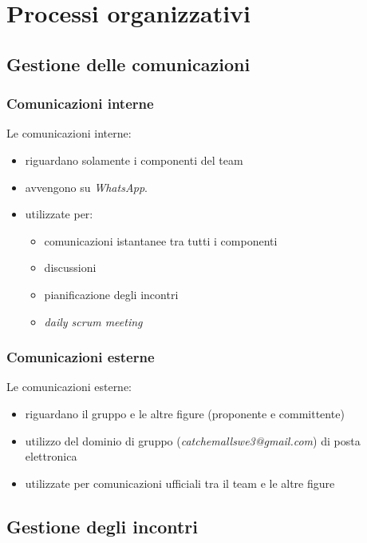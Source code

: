 \section{Processi organizzativi}
    \subsection{Gestione delle comunicazioni}
        \subsubsection{Comunicazioni interne}
        Le comunicazioni interne:
        \begin{itemize}
            \item riguardano solamente i componenti del team 
            \item avvengono su \textit{WhatsApp}.
            \item utilizzate per:
                \begin{itemize}
                    \item comunicazioni istantanee tra tutti i componenti
                    \item discussioni
                    \item pianificazione degli incontri
                    \item \textit{daily scrum meeting} 
                \end{itemize}
        \end{itemize}
            
        \subsubsection{Comunicazioni esterne}
        Le comunicazioni esterne:
        \begin{itemize}
            \item riguardano il gruppo e le altre figure (proponente e committente)
            \item utilizzo del dominio di gruppo (\textit{catchemallswe3@gmail.com}) di posta elettronica
            \item utilizzate per comunicazioni ufficiali tra il team e le altre figure
        \end{itemize}

        
    \subsection{Gestione degli incontri}
